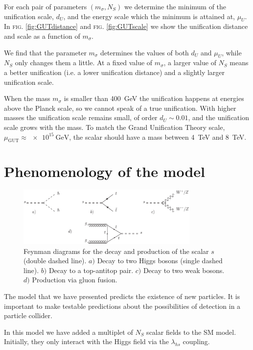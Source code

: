 \documentclass[aps,prd,preprintnumbers,nofootinbibn,twocolumn]{revtex4}
\begin{document}
For each pair of parameters $(m_\sigma, N_S)$ we determine the minimum of the unification scale, $d_U$, and the energy scale which the minimum is attained at, $\mu_U$.  In \textsc{fig.} \ref{fig:GUTdistance} and \textsc{fig.} \ref{fig:GUTscale} we show the unification distance and scale as a function of $m_\sigma$. 

We find that the parameter $m_\sigma$ determines the values of both $d_U$ and $\mu_U$, while $N_S$ only changes them a little. At a fixed value of $m_\sigma$, a larger value of $N_S$ means a better unification (i.e. a lower unification distance) and a slightly larger unification scale. 


When the mass $m_\sigma$ is smaller than \SI{400}{\giga\electronvolt} the unification happens at energies above the Planck scale, so we cannot speak of a true unification. With higher masses the unification scale remains small, of order $d_U \sim 0.01$, and the unification scale grows with the mass. To match the Grand Unification Theory scale, $\mu_{\mathrm{GUT}}\approx \SI{e15}{\giga\electronvolt}$, the scalar should have a mass between \SI{4}{\tera\electronvolt} and \SI{8}{\tera\electronvolt}. 



\section{Phenomenology of the model}\label{sect:pheno}
\begin{figure}[t]
\centering
\includegraphics[width=0.8\textwidth]{diagrams}
\caption{Feynman diagrams for the decay and production of the scalar $s$ (double dashed line). $a)$ Decay to two Higgs bosons (single dashed line). $b)$ Decay to a top-antitop pair. $c)$ Decay to two weak bosons. $d)$ Production via gluon fusion.}\label{fig:diagrams}
\end{figure}
The model that we have presented predicts the existence of new particles. It is important to make testable predictions about the possibilities of detection in a particle collider. 


In this model we have added a multiplet of $N_S$ scalar fields to the SM model. Initially, they only interact with the Higgs field via the $\lambda_{hs}$ coupling.
\end{document}
